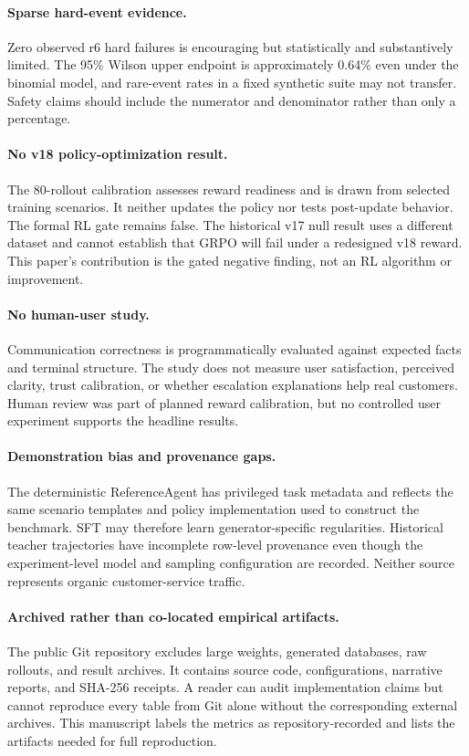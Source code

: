 \documentclass[11pt]{article}
\begin{document}
\paragraph{Sparse hard-event evidence.}
Zero observed r6 hard failures is encouraging but statistically and substantively limited. The 95\% Wilson upper endpoint is approximately 0.64\% even under the binomial model, and rare-event rates in a fixed synthetic suite may not transfer. Safety claims should include the numerator and denominator rather than only a percentage.

\paragraph{No v18 policy-optimization result.}
The 80-rollout calibration assesses reward readiness and is drawn from selected training scenarios. It neither updates the policy nor tests post-update behavior. The formal RL gate remains false. The historical v17 null result uses a different dataset and cannot establish that GRPO will fail under a redesigned v18 reward. This paper's contribution is the gated negative finding, not an RL algorithm or improvement.

\paragraph{No human-user study.}
Communication correctness is programmatically evaluated against expected facts and terminal structure. The study does not measure user satisfaction, perceived clarity, trust calibration, or whether escalation explanations help real customers. Human review was part of planned reward calibration, but no controlled user experiment supports the headline results.

\paragraph{Demonstration bias and provenance gaps.}
The deterministic ReferenceAgent has privileged task metadata and reflects the same scenario templates and policy implementation used to construct the benchmark. SFT may therefore learn generator-specific regularities. Historical teacher trajectories have incomplete row-level provenance even though the experiment-level model and sampling configuration are recorded. Neither source represents organic customer-service traffic.

\paragraph{Archived rather than co-located empirical artifacts.}
The public Git repository excludes large weights, generated databases, raw rollouts, and result archives. It contains source code, configurations, narrative reports, and SHA-256 receipts. A reader can audit implementation claims but cannot reproduce every table from Git alone without the corresponding external archives. This manuscript labels the metrics as repository-recorded and lists the artifacts needed for full reproduction.
\end{document}
